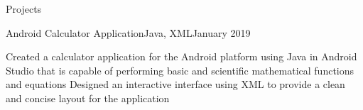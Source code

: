 \documentclass[fit]{cvtemplate}
\begin{document}
\begin{cvtext}
\begin{cvsection}{Projects}
\begin{cvsubsection}
  \end{cvsubsection}


  \begin{cvsubsection}
    {Android Calculator Application}{Java, XML}{January 2019}{}

    \listitem Created a calculator application for the Android platform using Java in Android Studio that is capable of performing basic and scientific mathematical functions and equations
    \listitem Designed an interactive interface using XML to provide a clean and concise layout for the application

  \end{cvsubsection}


\end{cvsection}


\end{cvtext}
\end{document}
